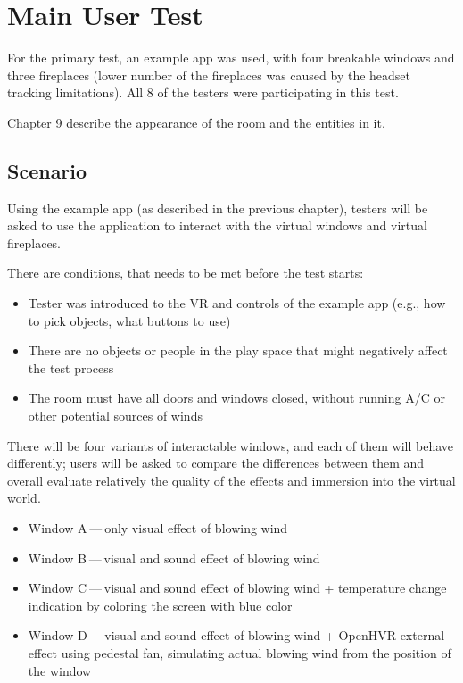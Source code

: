 \hypertarget{x-main-user-test}{\section{Main User Test}}
For the primary test, an example app was used, with four breakable windows
and three fireplaces (lower number of the fireplaces was caused by
the headset tracking limitations). All 8 of the testers were participating
in this test.


Chapter 9 describe the appearance of the room and the entities in it.


\hypertarget{x-scenario}{\subsection{Scenario}}
Using the example app (as described in the previous chapter), testers will
be asked to use the application to interact with the virtual windows and
virtual fireplaces.


There are conditions, that needs to be met before the test starts:


\begin{itemize}

\item Tester was introduced to the VR and controls of
the example app (e.g., how to pick objects, what buttons to use)

\item There are no objects or people in the play space that might negatively affect
the test process

\item The room must have all doors and windows closed, without running A/C
or other potential sources of winds

\end{itemize}


There will be four variants of interactable windows, and each of them will
behave differently; users will be asked to compare the differences between
them and overall evaluate relatively the quality of the effects and
immersion into the virtual world.


\begin{itemize}

\item Window A — only visual effect of blowing wind

\item Window B — visual and sound effect of blowing wind

\item Window C — visual and sound effect of blowing wind + temperature change
indication by coloring the screen with blue color

\item Window D — visual and sound effect of blowing wind + OpenHVR external effect
using pedestal fan, simulating actual blowing wind from the position of
the window

\end{itemize}


